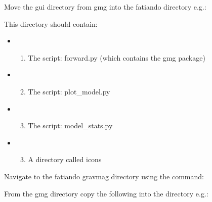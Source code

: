 \documentclass[a4paper,12pt,english]{sphinxmanual}
\begin{document}
Move the gui directory from gmg into the fatiando directory e.g.:

\begin{sphinxVerbatim}[commandchars=\\\{\}]
  
\end{sphinxVerbatim}

This directory should contain:
\begin{itemize}
\item {} \begin{enumerate}
\item {} 
The script: forward.py (which contains the gmg package)

\end{enumerate}

\item {} \begin{enumerate}
\setcounter{enumi}{1}
\item {} 
The script: plot\_model.py

\end{enumerate}

\item {} \begin{enumerate}
\setcounter{enumi}{2}
\item {} 
The script: model\_stats.py

\end{enumerate}

\item {} \begin{enumerate}
\setcounter{enumi}{2}
\item {} 
A directory called icons

\end{enumerate}

\end{itemize}

Navigate to the fatiando gravmag directory using the command:

\begin{sphinxVerbatim}[commandchars=\\\{\}]
 
\end{sphinxVerbatim}

From the gmg directory  copy the following into the  directory e.g.:

\begin{sphinxVerbatim}[commandchars=\\\{\}]
  
\end{sphinxVerbatim}
\end{document}
